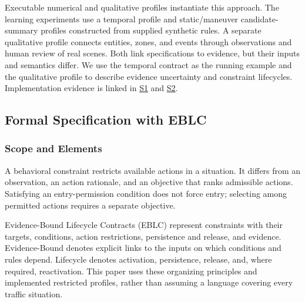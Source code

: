 \documentclass[nolineno]{ieeeaccess}
\begin{document}
Executable numerical and qualitative profiles instantiate this approach. The learning experiments use a temporal profile and static/maneuver candidate-summary profiles constructed from supplied synthetic rules. A separate qualitative profile connects entities, zones, and events through observations and human review of real scenes. Both link specifications to evidence, but their inputs and semantics differ. We use the temporal contract as the running example and the qualitative profile to describe evidence uncertainty and constraint lifecycles. Implementation evidence is linked in \href{\detokenize{projects/04-guardsynth-coc/experiments/paper1_cnl_learning/temporal_preservation.py}}{S1} and \href{\detokenize{platforms/eblc-bcv/src/guard_synth_eblc/action_contract.py}}{S2}.\par

\subsection{Formal Specification with EBLC}

\subsubsection{Scope and Elements}

A behavioral constraint restricts available actions in a situation. It differs from an observation, an action rationale, and an objective that ranks admissible actions. Satisfying an entry-permission condition does not force entry; selecting among permitted actions requires a separate objective.\par

Evidence-Bound Lifecycle Contracts (EBLC) represent constraints with their targets, conditions, action restrictions, persistence and release, and evidence. Evidence-Bound denotes explicit links to the inputs on which conditions and rules depend. Lifecycle denotes activation, persistence, release, and, where required, reactivation. This paper uses these organizing principles and implemented restricted profiles, rather than assuming a language covering every traffic situation.\par
\end{document}
